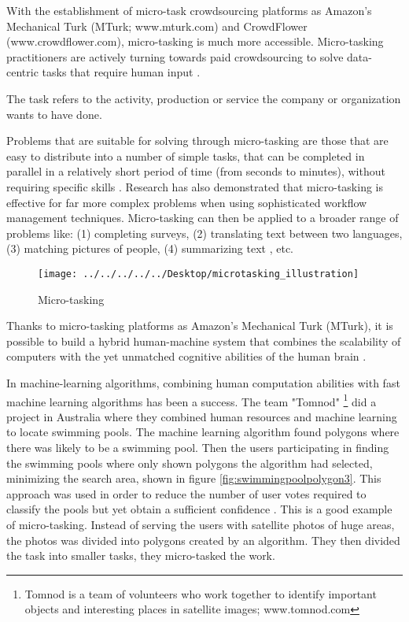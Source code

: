With the establishment of micro-task crowdsourcing platforms as Amazon's Mechanical Turk (MTurk; www.mturk.com) and CrowdFlower (www.crowdflower.com), micro-tasking is much more accessible. Micro-tasking practitioners are actively turning towards paid crowdsourcing to solve data-centric tasks that require human input \citep{Gadiraju2015}. 

The task refers to the activity, production or service the company or organization wants to have done.

Problems that are suitable for solving through micro-tasking are those that are easy to distribute into a number of simple tasks, that can be completed in parallel in a relatively short period of time (from seconds to minutes), without requiring specific skills \citep{Sarasua2012}. Research has also demonstrated that micro-tasking is effective for far more complex problems when using sophisticated workflow management techniques. Micro-tasking can then be applied to a broader range of problems like: (1) completing surveys, (2) translating text between two languages, (3) matching pictures of people, (4) summarizing text \citep{Bernstein2015a}, etc. 

\begin{figure}[H]
	\centering
	\texttt{[image: ../../../../../Desktop/microtasking\_illustration]}
	\caption{Micro-tasking \citep{Michelucci2015}}
	\label{fig:microtaskingillustration}
\end{figure}

Thanks to micro-tasking platforms as Amazon's Mechanical Turk (MTurk), it is possible to build a hybrid human-machine system that combines the scalability of computers with the yet unmatched cognitive abilities of the human brain \citep{Difallah2016}.

In machine-learning algorithms, combining human computation abilities with fast machine learning algorithms has been a success. The team "Tomnod" \footnote{Tomnod is a team of volunteers who work together to identify important objects and interesting places in satellite images; www.tomnod.com} did a project in Australia where they combined human resources and machine learning to locate swimming pools. The machine learning algorithm found polygons where there was likely to be a swimming pool. Then the users participating in finding the swimming pools where only shown polygons the algorithm had selected, minimizing the search area, shown in figure \ref{fig:swimmingpoolpolygon3}. This approach was used in order to reduce the number of user votes required to classify the pools but yet obtain a sufficient confidence \citep{Kostas2016}. This is a good example of micro-tasking. Instead of serving the users with satellite photos of huge areas, the photos was divided into polygons created by an algorithm. They then divided the task into smaller tasks, they micro-tasked the work. 

